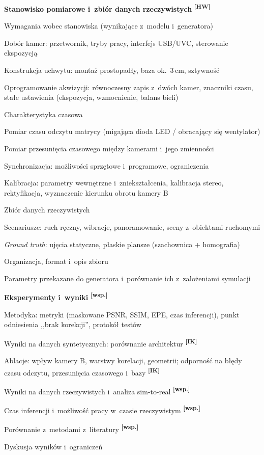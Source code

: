 \documentclass[11pt,a4paper]{article}
\newcommand{\IK}{\textsuperscript{\textbf{[IK]}}}
\newcommand{\HW}{\textsuperscript{\textbf{[HW]}}}
\newcommand{\WS}{\textsuperscript{\textbf{[wsp.]}}}
\begin{document}
\begin{toc}
\item \textbf{Stanowisko pomiarowe i~zbiór danych rzeczywistych} \HW
  \begin{toc}
    \item Wymagania wobec stanowiska (wynikające z~modelu i~generatora)
    \item Dobór kamer: przetwornik, tryby pracy, interfejs USB/UVC, sterowanie ekspozycją
    \item Konstrukcja uchwytu: montaż prostopadły, baza ok.\ 3\,cm, sztywność
    \item Oprogramowanie akwizycji: równoczesny zapis z~dwóch kamer, znaczniki czasu, stałe
          ustawienia (ekspozycja, wzmocnienie, balans bieli)
    \item Charakterystyka czasowa
      \begin{toc}
        \item Pomiar czasu odczytu matrycy (migająca dioda LED / obracający się wentylator)
        \item Pomiar przesunięcia czasowego między kamerami i~jego zmienności
        \item Synchronizacja: możliwości sprzętowe i~programowe, ograniczenia
      \end{toc}
    \item Kalibracja: parametry wewnętrzne i~zniekształcenia, kalibracja
          stereo, rektyfikacja, wyznaczenie kierunku obrotu kamery B
    \item Zbiór danych rzeczywistych
      \begin{toc}
        \item Scenariusze: ruch ręczny, wibracje, panoramowanie, sceny z~obiektami ruchomymi
        \item \emph{Ground truth}: ujęcia statyczne, płaskie plansze (szachownica + homografia)
        \item Organizacja, format i~opis zbioru
      \end{toc}
    \item Parametry przekazane do generatora i~porównanie ich z~założeniami symulacji
  \end{toc}

\item \textbf{Eksperymenty i~wyniki} \WS
  \begin{toc}
    \item Metodyka: metryki (maskowane PSNR, SSIM, EPE, czas inferencji), punkt
          odniesienia ,,brak korekcji'', protokół testów
    \item Wyniki na danych syntetycznych: porównanie architektur \IK
    \item Ablacje: wpływ kamery B, warstwy korelacji, geometrii; odporność na błędy czasu
          odczytu, przesunięcia czasowego i~bazy \IK
    \item Wyniki na danych rzeczywistych i~analiza sim-to-real \WS
    \item Czas inferencji i~możliwość pracy w~czasie rzeczywistym \WS
    \item Porównanie z~metodami z~literatury \WS
    \item Dyskusja wyników i~ograniczeń
  \end{toc}


\end{toc}
\end{document}

